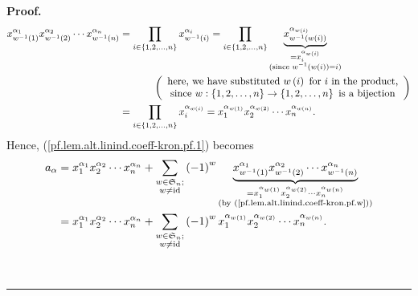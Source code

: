 \documentclass[numbers=enddot,12pt,final,onecolumn,notitlepage]{scrartcl}%
\theoremstyle{definition}
\newenvironment{proof}[1][Proof]{\noindent\textbf{#1.} }{\ \rule{0.5em}{0.5em}}
\let\sumnonlimits\sum
\let\prodnonlimits\prod
\renewcommand{\sum}{\sumnonlimits\limits}
\renewcommand{\prod}{\prodnonlimits\limits}
\newenvironment{verlong}{}{}
\begin{document}
\begin{proof}
\begin{verlong}
\begin{align}
x_{w^{-1}\left(  1\right)  }^{\alpha_{1}}x_{w^{-1}\left(  2\right)  }%
^{\alpha_{2}}\cdots x_{w^{-1}\left(  n\right)  }^{\alpha_{n}}  &  =\prod
_{i\in\left\{  1,2,\ldots,n\right\}  }x_{w^{-1}\left(  i\right)  }^{\alpha
_{i}}=\prod_{i\in\left\{  1,2,\ldots,n\right\}  }\underbrace{x_{w^{-1}\left(
w\left(  i\right)  \right)  }^{\alpha_{w\left(  i\right)  }}}%
_{\substack{=x_{i}^{\alpha_{w\left(  i\right)  }}\\\text{(since }w^{-1}\left(
w\left(  i\right)  \right)  =i\text{)}}}\nonumber\\
&  \ \ \ \ \ \ \ \ \ \ \left(
\begin{array}
[c]{c}%
\text{here, we have substituted }w\left(  i\right)  \text{ for }i\text{ in the
product,}\\
\text{since }w:\left\{  1,2,\ldots,n\right\}  \rightarrow\left\{
1,2,\ldots,n\right\}  \text{ is a bijection}%
\end{array}
\right) \nonumber\\
&  =\prod_{i\in\left\{  1,2,\ldots,n\right\}  }x_{i}^{\alpha_{w\left(
i\right)  }}=x_{1}^{\alpha_{w\left(  1\right)  }}x_{2}^{\alpha_{w\left(
2\right)  }}\cdots x_{n}^{\alpha_{w\left(  n\right)  }}.
\label{pf.lem.alt.linind.coeff-kron.pf.w}%
\end{align}
Hence, (\ref{pf.lem.alt.linind.coeff-kron.pf.1}) becomes%
\begin{align}
a_{\alpha}  &  =x_{1}^{\alpha_{1}}x_{2}^{\alpha_{2}}\cdots x_{n}^{\alpha_{n}%
}+\sum_{\substack{w\in\mathfrak{S}_{n};\\w\neq\operatorname*{id}}}\left(
-1\right)  ^{w}\underbrace{x_{w^{-1}\left(  1\right)  }^{\alpha_{1}}%
x_{w^{-1}\left(  2\right)  }^{\alpha_{2}}\cdots x_{w^{-1}\left(  n\right)
}^{\alpha_{n}}}_{\substack{=x_{1}^{\alpha_{w\left(  1\right)  }}x_{2}%
^{\alpha_{w\left(  2\right)  }}\cdots x_{n}^{\alpha_{w\left(  n\right)  }%
}\\\text{(by (\ref{pf.lem.alt.linind.coeff-kron.pf.w}))}}}\nonumber\\
&  =x_{1}^{\alpha_{1}}x_{2}^{\alpha_{2}}\cdots x_{n}^{\alpha_{n}}%
+\sum_{\substack{w\in\mathfrak{S}_{n};\\w\neq\operatorname*{id}}}\left(
-1\right)  ^{w}x_{1}^{\alpha_{w\left(  1\right)  }}x_{2}^{\alpha_{w\left(
2\right)  }}\cdots x_{n}^{\alpha_{w\left(  n\right)  }}.
\label{pf.lem.alt.linind.coeff-kron.pf.2}%
\end{align}



\end{verlong}
\end{proof}
\end{document}
